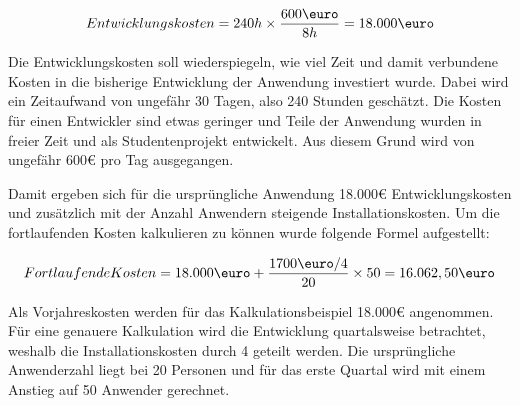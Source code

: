 \begin{align}
    Entwicklungskosten = 240h \times \frac{600\mbox{\euro}}{8h} = 18.000\mbox{\euro}
\end{align}

Die Entwicklungskosten soll wiederspiegeln, wie viel Zeit und damit verbundene Kosten in die bisherige Entwicklung der Anwendung investiert wurde. Dabei wird ein Zeitaufwand von ungefähr 30 Tagen, also 240 Stunden geschätzt. Die Kosten für einen Entwickler sind etwas geringer und Teile der Anwendung wurden in freier Zeit und als Studentenprojekt entwickelt. Aus diesem Grund wird von ungefähr 600€ pro Tag ausgegangen.

Damit ergeben sich für die ursprüngliche Anwendung 18.000€ Entwicklungskosten und zusätzlich mit der Anzahl Anwendern steigende Installationskosten. Um die fortlaufenden Kosten kalkulieren zu können wurde folgende Formel aufgestellt:

\begin{align}
    Fortlaufende Kosten = 18.000\mbox{\euro} + \frac{1700\mbox{\euro}/4}{20} \times 50 = 16.062,50\mbox{\euro}
\end{align}

Als Vorjahreskosten werden für das Kalkulationsbeispiel 18.000€ angenommen. Für eine genauere Kalkulation wird die Entwicklung quartalsweise betrachtet, weshalb die Installationskosten durch 4 geteilt werden. Die ursprüngliche Anwenderzahl liegt bei 20 Personen und für das erste Quartal wird mit einem Anstieg auf 50 Anwender gerechnet.
\pagebreak





